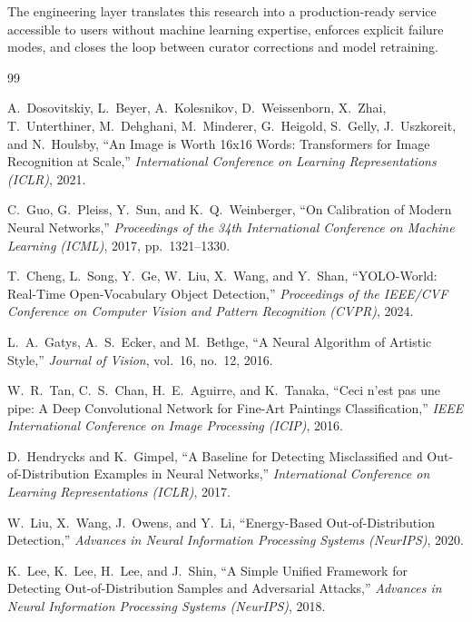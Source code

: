 \documentclass[12pt, a4paper, twoside]{article}
\begin{document}
The engineering layer translates this research into a production-ready service accessible to users without machine learning expertise, enforces explicit failure modes, and closes the loop between curator corrections and model retraining.

\clearpage
\begin{thebibliography}{99}

  A.\ Dosovitskiy, L.\ Beyer, A.\ Kolesnikov, D.\ Weissenborn, X.\ Zhai, T.\ Unterthiner, M.\ Dehghani, M.\ Minderer, G.\ Heigold, S.\ Gelly, J.\ Uszkoreit, and N.\ Houlsby,
  ``An Image is Worth 16x16 Words: Transformers for Image Recognition at Scale,''
  \textit{International Conference on Learning Representations (ICLR)}, 2021.

  C.\ Guo, G.\ Pleiss, Y.\ Sun, and K.\ Q.\ Weinberger,
  ``On Calibration of Modern Neural Networks,''
  \textit{Proceedings of the 34th International Conference on Machine Learning (ICML)}, 2017, pp.\ 1321--1330.

  T.\ Cheng, L.\ Song, Y.\ Ge, W.\ Liu, X.\ Wang, and Y.\ Shan,
  ``YOLO-World: Real-Time Open-Vocabulary Object Detection,''
  \textit{Proceedings of the IEEE/CVF Conference on Computer Vision and Pattern Recognition (CVPR)}, 2024.

  L.\ A.\ Gatys, A.\ S.\ Ecker, and M.\ Bethge,
  ``A Neural Algorithm of Artistic Style,''
  \textit{Journal of Vision}, vol.\ 16, no.\ 12, 2016.

  W.\ R.\ Tan, C.\ S.\ Chan, H.\ E.\ Aguirre, and K.\ Tanaka,
  ``Ceci n'est pas une pipe: A Deep Convolutional Network for Fine-Art Paintings Classification,''
  \textit{IEEE International Conference on Image Processing (ICIP)}, 2016.

  D.\ Hendrycks and K.\ Gimpel,
  ``A Baseline for Detecting Misclassified and Out-of-Distribution Examples in Neural Networks,''
  \textit{International Conference on Learning Representations (ICLR)}, 2017.

  W.\ Liu, X.\ Wang, J.\ Owens, and Y.\ Li,
  ``Energy-Based Out-of-Distribution Detection,''
  \textit{Advances in Neural Information Processing Systems (NeurIPS)}, 2020.

  K.\ Lee, K.\ Lee, H.\ Lee, and J.\ Shin,
  ``A Simple Unified Framework for Detecting Out-of-Distribution Samples and Adversarial Attacks,''
  \textit{Advances in Neural Information Processing Systems (NeurIPS)}, 2018.


\end{thebibliography}
\end{document}
